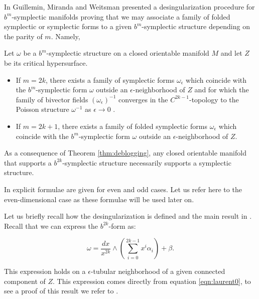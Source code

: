 {In \cite{GMW17} Guillemin, Miranda and Weitsman presented a desingularization procedure for $b^m$-symplectic manifolds proving that we may associate a family of folded symplectic or symplectic forms to a given $b^m$-symplectic structure depending on the parity of $m$. Namely,}

\begin{theorem}\label{thm:deblogging}
 {Let $\omega$ be a $b^m$-symplectic structure  on a {closed orientable manifold} $M$  and let $Z$ be its critical hypersurface.
\begin{itemize}
\item If $m=2k$, there exists  a family of symplectic forms ${\omega_{\epsilon}}$ which coincide with  the $b^{m}$-symplectic form
    $\omega$ outside an $\epsilon$-neighborhood of $Z$ and for which  the family of bivector fields $(\omega_{\epsilon})^{-1}$ converges in
    the $C^{2k-1}$-topology to the Poisson structure $\omega^{-1}$ as $\epsilon\to 0$ .
\item If $m=2k+1$, there exists  a family of folded symplectic forms ${\omega_{\epsilon}}$ which coincide with  the $b^{m}$-symplectic form
    $\omega$ outside an $\epsilon$-neighborhood of $Z$.
\end{itemize}}

\end{theorem}


{As a consequence of Theorem \ref{thm:deblogging}, any closed orientable manifold that
supports a $b^{2k}$-symplectic structure necessarily supports a symplectic structure.}


{ In \cite{GMW17} explicit formulae are given for even and odd cases. Let us refer here to the even-dimensional case as these formulae will be used later on.}



Let us  briefly recall how the desingularization is defined and  the main result in \cite{GMW17}. Recall that we can express the $b^{2k}$-form as:

\begin{equation}\label{eq:laurent2}
\omega = \frac{dx}{x^{2k}}\wedge \left(\sum_{i=0}^{2k-1}x^i\alpha_i\right) + \beta.
\end{equation}


This expression holds on a $\epsilon$-tubular neighborhood of a given connected component of $Z$. This expression comes directly from equation \ref{eqn:laurent0}, to see a proof of this result we refer to \cite{Scott16}.

